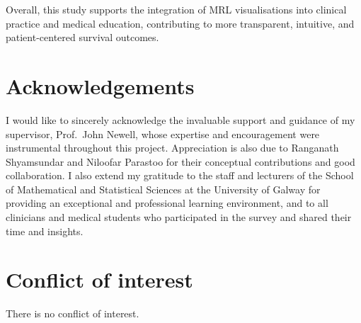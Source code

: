 \documentclass[
  onecolumn]{article}
\begin{document}
Overall, this study supports the integration of MRL visualisations into
clinical practice and medical education, contributing to more
transparent, intuitive, and patient-centered survival outcomes.

\section{Acknowledgements}\label{acknowledgements}

I would like to sincerely acknowledge the invaluable support and
guidance of my supervisor, Prof.~John Newell, whose expertise and
encouragement were instrumental throughout this project. Appreciation is
also due to Ranganath Shyamsundar and Niloofar Parastoo for their
conceptual contributions and good collaboration. I also extend my
gratitude to the staff and lecturers of the School of Mathematical and
Statistical Sciences at the University of Galway for providing an
exceptional and professional learning environment, and to all clinicians
and medical students who participated in the survey and shared their
time and insights.

\section{Conflict of interest}\label{conflict-of-interest}

There is no conflict of interest.

\renewcommand\refname{References}
  
\end{document}
